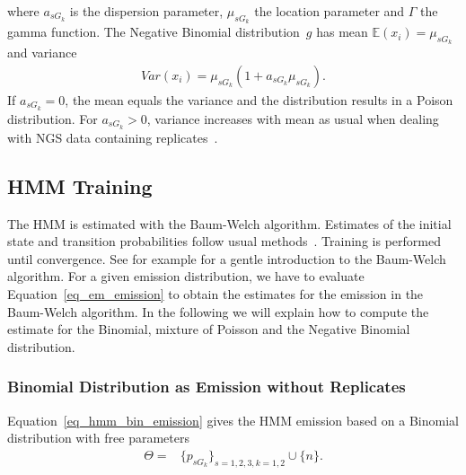 \noindent 
where $a_{sG_k}$ is the dispersion parameter, $\mu_{sG_k}$ the location parameter and $\Gamma$ the gamma function.
The Negative Binomial distribution~$g$ has mean $\mathbb{E}(x_i) = \mu_{sG_k}$ and variance 
\begin{align}
 Var(x_i) = \mu_{sG_k} (1 + a_{sG_k} \mu_{sG_k}). \label{eq_ng_var}
\end{align}
If $a_{sG_k}=0$, the mean equals the variance and the distribution results in a Poison distribution. 
For  $a_{sG_k}>0$, variance increases with mean as usual when dealing with NGS data containing replicates~\citep{anders2010}.






\subsection{HMM Training}
\label{sec_hmm_training}
The HMM is estimated with the Baum-Welch algorithm. 
Estimates of the initial state and transition probabilities follow usual methods~\citep{rabiner1989}. 
Training is performed until convergence. 
See for example \cite{Couvreur1996} for a gentle introduction to the Baum-Welch algorithm.
For a given emission distribution, we have to evaluate Equation~\ref{eq_em_emission} to obtain the estimates for the emission in the Baum-Welch algorithm.
In the following we will explain how to compute the estimate for the Binomial, mixture of Poisson and the Negative Binomial distribution.

\subsubsection{Binomial Distribution as Emission without Replicates}
Equation~\ref{eq_hmm_bin_emission} gives the HMM emission based on a Binomial distribution with free parameters
\begin{align*}
 \Theta =& \{p_{sG_k}\}_{s = 1,2,3, k = 1,2} \cup \{n\}.
\end{align*}

